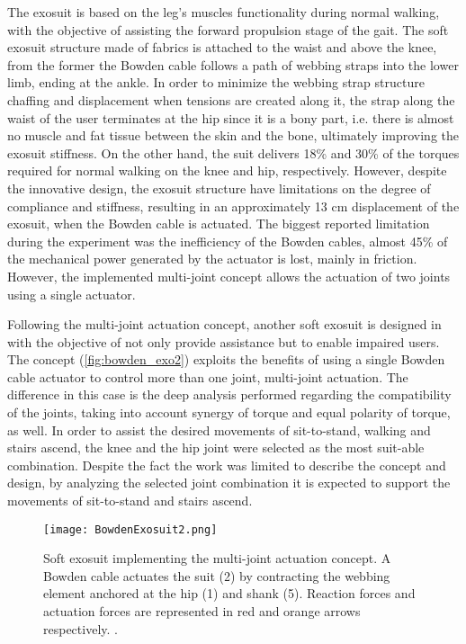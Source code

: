 The exosuit is based on the leg's muscles functionality during normal walking, with the objective of assisting the forward propulsion stage of the gait. The soft exosuit structure made of fabrics is attached to the waist and above the knee, from the former the Bowden cable follows a path of webbing straps into the lower limb, ending at the ankle. In order to minimize the webbing strap structure chaffing and displacement when tensions are created along it, the strap along the waist of the user terminates at the hip since it is a bony part, i.e. there is almost no muscle and fat tissue between the skin and the bone, ultimately improving the exosuit stiffness. On the other hand, the suit delivers 18\% and 30\% of the torques required for normal walking on the knee and hip, respectively. However, despite the innovative design, the exosuit structure have limitations on the degree of compliance and stiffness, resulting in an approximately 13 cm displacement of the exosuit, when the Bowden cable is actuated. The biggest reported limitation during the experiment was the inefficiency of the Bowden cables, almost 45\% of the mechanical power generated by the actuator is lost, mainly in friction. However, the implemented multi-joint concept allows the actuation of two joints using a single actuator.

Following the multi-joint actuation concept, another soft exosuit is designed in \cite{Bartenbach2015} with the objective of not only provide assistance but to enable impaired users. The concept (\autoref{fig:bowden_exo2}) exploits the benefits of using a single Bowden cable actuator to control more than one joint, multi-joint actuation. The difference in this case is the deep analysis performed regarding the compatibility of the joints, taking into account synergy of torque and equal polarity of torque, as well. In order to assist the desired movements of sit-to-stand, walking and stairs ascend, the knee and the hip joint were selected as the most suit-able combination. Despite the fact the work was limited to describe the concept and design, by analyzing the selected joint combination it is expected to support the movements of sit-to-stand and stairs ascend.
\begin{figure}[hbtp!]
    \centering
    \texttt{[image: BowdenExosuit2.png]}
    \caption{Soft exosuit implementing the multi-joint actuation concept. A Bowden cable actuates the suit (2) by contracting the webbing element anchored at the hip (1) and shank (5). Reaction forces and actuation forces are represented in red and orange arrows respectively. \cite{Bartenbach2015}. }
    \label{fig:bowden_exo2}
\end{figure}

